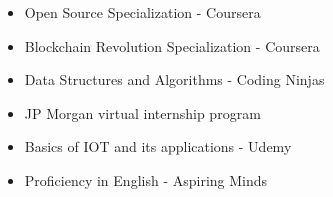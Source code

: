 \medskip
{}
		     
\begin{itemize}
\medskip    \item Open Source Specialization - Coursera                                       
  \medskip  \item Blockchain Revolution Specialization - Coursera                     
   \medskip\item Data Structures and Algorithms - Coding Ninjas
  \medskip\item JP Morgan virtual internship program                                         
   \medskip\item Basics of IOT and its applications - Udemy                           \smallskip \item Proficiency in English - Aspiring Minds
  
\end{itemize}